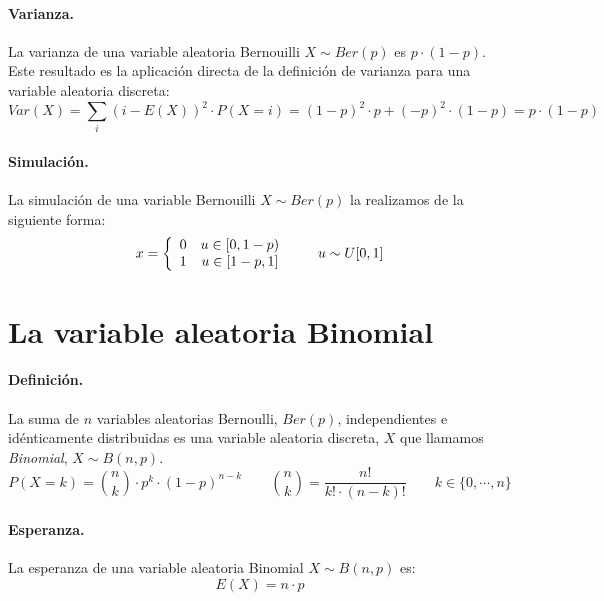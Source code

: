 \paragraph{Varianza.} La varianza de una variable aleatoria Bernouilli $X \sim Ber(p)$ 
es $p \cdot (1-p)$. Este resultado es la aplicaci\'on directa de la definici\'on 
de varianza para una variable aleatoria discreta:
\begin{displaymath}
Var(X)= \sum_{i} (i-E(X))^2 \cdot P(X=i) = (1-p)^2 \cdot p + (-p)^2 \cdot (1-p) = p \cdot (1-p)
\end{displaymath}
 
\paragraph{Simulaci\'on.} La simulaci\'on de una variable Bernouilli 
$X \sim Ber(p)$ la realizamos de la siguiente forma:
\begin{displaymath}
x= \left\{
\begin{array}{cc}
0 & u \in [0,1-p) \cr
1 & u \in [1-p,1]
\end{array}
\right.
\qquad u \sim U[0,1]
\end{displaymath}


\section{La variable aleatoria Binomial}

\paragraph{Definici\'on.} La suma de $n$ variables aleatorias Bernoulli, $Ber(p)$,  
independientes e id\'enticamente distribuidas es una variable aleatoria discreta, 
$X$ que llamamos \emph{Binomial}, $X \sim B(n,p)$.
\begin{displaymath}
P(X=k) = {n \choose k} \cdot p^k \cdot (1-p)^{n-k} \qquad {n \choose k} = \frac{n!}{k! \cdot (n-k)!}
\qquad k \in \{0, \cdots, n\}
\end{displaymath}

\paragraph{Esperanza.} La esperanza de una variable aleatoria Binomial 
$X \sim B(n,p)$ es:
\begin{displaymath}
E(X) = n \cdot p
\end{displaymath}


